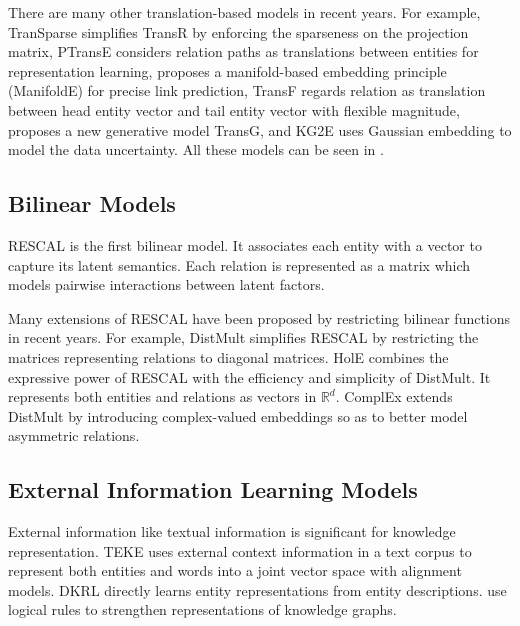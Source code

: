 \documentclass[11pt,a4paper]{article}
\begin{document}
  There are many other translation-based models in recent years. For example, 
  TranSparse \cite{TranSparse} simplifies TransR by enforcing the sparseness on the projection matrix, 
  PTransE \cite{PTransE} considers relation paths as translations between entities for representation learning,
  \cite{ManifoldE} proposes a manifold-based embedding principle (ManifoldE) for precise link prediction, 
  TransF \cite{TransF} regards relation as translation between head entity vector and tail entity vector with flexible magnitude,
  \cite{TransG} proposes a new generative model TransG, and KG2E \cite{KG2E} uses Gaussian embedding to model the data uncertainty.
  All these models can be seen in \cite{Survey}.
  
  \subsection{Bilinear Models}
  
  RESCAL\cite{RESCAL} is the first bilinear model. It associates each entity with a vector to capture its latent semantics. 
  Each relation is represented as a matrix which models pairwise interactions between latent factors.
  
  Many extensions of RESCAL have been proposed by restricting bilinear functions in recent years.
  For example, DistMult \cite{DistMult} simplifies RESCAL by restricting the matrices representing relations to diagonal matrices.
  HolE\cite{HolE} combines the expressive power of RESCAL with the efficiency and simplicity of DistMult. 
  It represents both entities and relations as vectors in $\mathbb{R}^{d}$.
  ComplEx\cite{complEx} extends DistMult by introducing complex-valued embeddings so as to better model asymmetric relations.
   
  \subsection{External Information Learning Models} 
  
  External information like textual information is significant for knowledge representation.
  TEKE \cite{TEKE} uses external context information in a text corpus to represent both entities 
  and words into a joint vector space with alignment models. DKRL \cite{DKRL} directly learns entity 
  representations from entity descriptions. \cite{Wang2015Knowledge,Shu2016Jointly,Rockt2015Injecting} use logical rules to strengthen representations of knowledge graphs.
  
\end{document}
